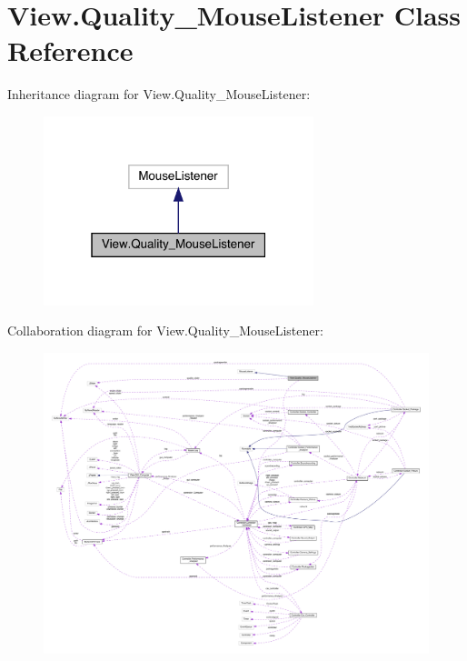 \hypertarget{class_view_1_1_quality___mouse_listener}{}\section{View.\+Quality\+\_\+\+Mouse\+Listener Class Reference}
\label{class_view_1_1_quality___mouse_listener}


Inheritance diagram for View.\+Quality\+\_\+\+Mouse\+Listener\+:
\nopagebreak
\begin{figure}[H]
\begin{center}
\leavevmode
\includegraphics[width=223pt]{class_view_1_1_quality___mouse_listener__inherit__graph}
\end{center}
\end{figure}


Collaboration diagram for View.\+Quality\+\_\+\+Mouse\+Listener\+:
\nopagebreak
\begin{figure}[H]
\begin{center}
\leavevmode
\includegraphics[width=350pt]{class_view_1_1_quality___mouse_listener__coll__graph}
\end{center}
\end{figure}
